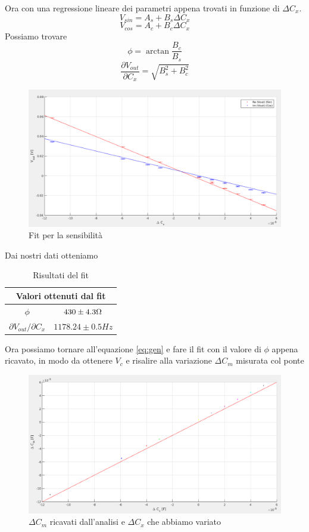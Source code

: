 \documentclass[12pt,]{article}
\begin{document}
Ora con una regressione lineare dei parametri appena trovati in funzione di $ \Delta C_x$.
$$V_{sin}= A_s + B_s \Delta{C_x}$$
$$V_{cos} = A_c + B_c \Delta{C_x}$$
Possiamo trovare 
\begin{equation}
\phi = \arctan{\frac{B_c}{B_s}}
\end{equation}
\begin{equation}
\frac{\partial{V_{out}}}{\partial{C_x}} = \sqrt{B_s^2 + B_c^2}
\end{equation}
\begin{figure}[H]
\centering
\includegraphics[width=\textwidth]{fitsensibilita}
\caption{Fit per la sensibilità}
\end{figure}
Dai nostri dati otteniamo
\begin{table}[H]
\centering
\begin{tabular}{c|c}
\toprule
\multicolumn{2}{c}{Valori ottenuti dal fit}\\
\midrule
\rowcolor{black!20}$\phi$ & $430 \pm 4.3  \ohm$ \\
$\partial V_{out}/\partial C_x $ & $ 1178.24\pm 0.5 Hz $ \\
\bottomrule
\end{tabular}
\caption{Risultati del fit}
\end{table}
Ora possiamo tornare all'equazione \eqref{eq:gen} e fare il fit con il valore di $\phi$ appena ricavato, in modo da ottenere $V_c$ e risalire alla variazione $\Delta C_m$ misurata col ponte
\begin{figure}[H]
\centering
\includegraphics[width=\textwidth]{deltacm}
\caption{$\Delta C_m$ ricavati dall'analisi e $\Delta C_x$ che abbiamo variato}
\end{figure}
\end{document}
